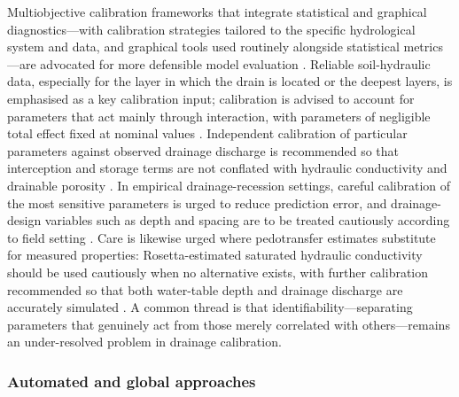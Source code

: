 \documentclass[11pt]{article}
\begin{document}
Multiobjective calibration frameworks that integrate statistical and graphical diagnostics---with calibration strategies tailored to the specific hydrological system and data, and graphical tools used routinely alongside statistical metrics---are advocated for more defensible model evaluation \parencite{Bruhn2025}. Reliable soil-hydraulic data, especially for the layer in which the drain is located or the deepest layers, is emphasised as a key calibration input; calibration is advised to account for parameters that act mainly through interaction, with parameters of negligible total effect fixed at nominal values \parencite{Wang2006}. Independent calibration of particular parameters against observed drainage discharge is recommended so that interception and storage terms are not conflated with hydraulic conductivity and drainable porosity \parencite{Henine2022}. In empirical drainage-recession settings, careful calibration of the most sensitive parameters is urged to reduce prediction error, and drainage-design variables such as depth and spacing are to be treated cautiously according to field setting \parencite{Timalsina2023}. Care is likewise urged where pedotransfer estimates substitute for measured properties: Rosetta-estimated saturated hydraulic conductivity should be used cautiously when no alternative exists, with further calibration recommended so that both water-table depth and drainage discharge are accurately simulated \parencite{Malota2022}. A common thread is that identifiability---separating parameters that genuinely act from those merely correlated with others---remains an under-resolved problem in drainage calibration.

\subsubsection{Automated and global approaches}
\end{document}
